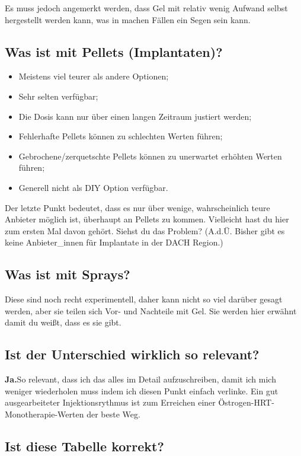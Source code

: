 \documentclass{article}
\begin{document}
Es muss jedoch angemerkt werden, dass Gel mit relativ wenig Aufwand selbst hergestellt werden kann, was in machen Fällen ein Segen sein kann.

\subsection{Was ist mit Pellets (Implantaten)?}

\begin{itemize}
  \item Meistens viel teurer als andere Optionen;
  \item Sehr selten verfügbar;
  \item Die Dosis kann nur über einen langen Zeitraum justiert werden;
  \item Fehlerhafte Pellets können zu schlechten Werten führen;
  \item Gebrochene/zerquetschte Pellets können zu unerwartet erhöhten Werten führen;
  \item Generell nicht als DIY Option verfügbar.
\end{itemize}

Der letzte Punkt bedeutet, dass es nur über wenige, wahrscheinlich teure Anbieter möglich ist, überhaupt an Pellets zu kommen. Vielleicht hast du hier zum ersten Mal davon gehört. Siehst du das Problem? (A.d.Ü. Bisher gibt es keine Anbieter\_innen für Implantate in der DACH Region.)

\subsection{Was ist mit Sprays?}

Diese sind noch recht experimentell, daher kann nicht so viel darüber gesagt werden, aber sie teilen sich Vor- und Nachteile mit Gel. Sie werden hier erwähnt damit du weißt, dass es sie gibt.

\subsection{Ist der Unterschied wirklich so relevant?}

\textbf{Ja.}So relevant, dass ich das alles im Detail aufzuschreiben, damit ich mich weniger wiederholen muss indem ich diesen Punkt einfach verlinke. Ein gut ausgearbeiteter Injektionsrythmus ist zum Erreichen einer Östrogen-HRT-Monotherapie-Werten der beste Weg.

\subsection{Ist diese Tabelle korrekt?}\label{1-12}
\end{document}
